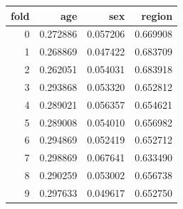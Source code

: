 \begin{tabular}{rrrr}
\toprule
fold & age & sex & region \\
\midrule
0 & 0.272886 & 0.057206 & 0.669908 \\
1 & 0.268869 & 0.047422 & 0.683709 \\
2 & 0.262051 & 0.054031 & 0.683918 \\
3 & 0.293868 & 0.053320 & 0.652812 \\
4 & 0.289021 & 0.056357 & 0.654621 \\
5 & 0.289008 & 0.054010 & 0.656982 \\
6 & 0.294869 & 0.052419 & 0.652712 \\
7 & 0.298869 & 0.067641 & 0.633490 \\
8 & 0.290259 & 0.053002 & 0.656738 \\
9 & 0.297633 & 0.049617 & 0.652750 \\
\bottomrule
\end{tabular}
